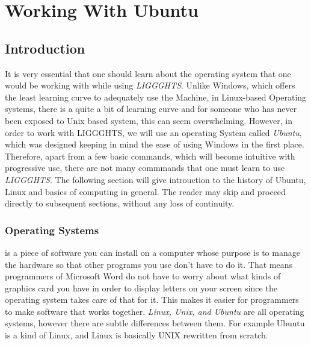 \documentclass{tufte-book} %
\newcommand{\Li}{\textit{LIGGGHTS}\xspace}
\begin{document}

\chapter{Working With Ubuntu}
\label{ch:1}


\section{Introduction}

\begin{fullwidth}
  It is very essential that one should learn about the operating system that one would be working with while using \textsc{\Li}. Unlike Windows, which offers the least learning curve to adequately use the Machine, in Linux-based Operating systems, there is a quite a bit of learning curve and for someone who has never been exposed to Unix based system, this can seem overwhelming. However, in order to work with \textsc{LIGGGHTS}, we will use an operating System called \emph{Ubuntu}, which was designed keeping in mind the ease of using Windows in the first place. Therefore, apart from a few basic commands, which will become intuitive with progressive use, there are not many commmands that one must learn to use \textsc{\Li}. The following section will give introuction to the history of Ubuntu, Linux and basics of computing in general. The reader may skip and proceed directly to subsequent sections, without any loss of continuity.
\end{fullwidth}
\subsection{Operating Systems}

 is a piece of software you can install on a computer whose purpose is to manage the hardware so that other programs you use don't have to do it. That means programmers of Microsoft Word do not have to worry about what kinds of graphics card you have in order to display letters on your screen since the operating system takes care of that for it. This makes it easier for programmers to make software that works together. 
\emph{Linux, Unix, and Ubuntu} are all operating systems, however there are subtle differences between them. For example Ubuntu is a kind of Linux, and Linux is basically UNIX rewritten from scratch.
\end{document}

